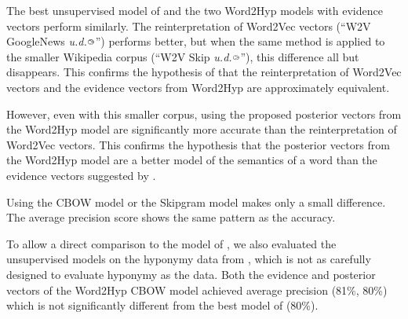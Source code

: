 \documentclass[11pt,a4paper]{article}
\newcommand{\bie}{{\raisebox{1.8pt}{\makebox[0pt][l]{\hspace{1.3pt}${\scriptscriptstyle >}$}${\scriptscriptstyle \bigcirc}$}}}
\begin{document}
The best unsupervised model of \citet{weeds2014learning}
and the two Word2Hyp models with evidence vectors perform similarly.  The
reinterpretation of Word2Vec vectors (``W2V GoogleNews {\em u.d.}$\bie$'')
performs better, but when the same method is applied to the smaller Wikipedia
corpus (``W2V Skip {\em u.d.}$\bie$''), this difference all but disappears.
This confirms the hypothesis of \citet{Henderson16_acl} that the
reinterpretation of Word2Vec vectors and the evidence vectors from
Word2Hyp are approximately equivalent.

However, even with this smaller corpus, using the proposed posterior vectors
from the Word2Hyp model are significantly more accurate than the
reinterpretation of Word2Vec vectors.  This confirms the hypothesis that the
posterior vectors from the Word2Hyp model are a better model of the semantics
of a word than the evidence vectors suggested by \citet{Henderson16_acl}.

Using the CBOW model or the Skipgram model makes only a small difference.
The average precision score shows the same pattern as the accuracy.



  
To allow a direct comparison to the model of \citet{Vilnis15}, we also
evaluated the unsupervised models on the hyponymy data from \citep{Baroni12},
which is not as carefully designed to evaluate hyponymy as the
\citep{weeds2014learning} data.
Both the evidence and posterior vectors of the Word2Hyp CBOW model achieved 
average precision (81\%, 80\%) which is not significantly different from the
best model of \citet{Vilnis15} (80\%).
\end{document}
